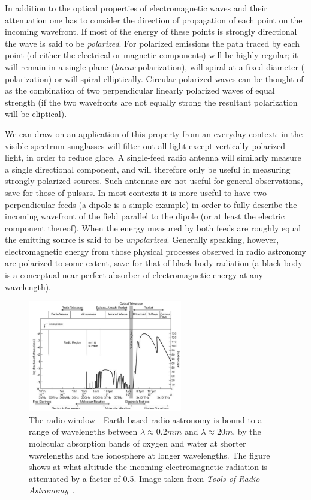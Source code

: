 \documentclass[a4paper,10pt]{report}
\begin{document}
In addition to the optical properties of electromagnetic waves and their attenuation one has to consider the direction of propagation of each point on the incoming wavefront. If most of the energy of these points is strongly 
directional the wave is said to be \textit{polarized}. For polarized emissions the path traced by each point (of either the electrical or magnetic components) will be highly regular; it will 
remain in a single plane (\textit{linear} polarization), will spiral at a fixed diameter ( polarization) or will spiral elliptically. Circular polarized waves can be thought 
of as the combination of two perpendicular linearly polarized waves of equal strength (if the two wavefronts are not equally strong the resultant polarization will be eliptical). 

We can draw on an application of this property from an everyday context: in the visible spectrum sunglasses will filter out all light except vertically polarized light, in order to reduce glare. A single-feed radio 
antenna will similarly measure a single directional component, and will therefore only be useful in measuring strongly polarized sources. Such antennae are not useful for general observations, save for 
those of pulsars. In most contexts it is more useful to have two perpendicular feeds (a dipole is a simple example) in order to fully describe the incoming wavefront of the field parallel to the dipole (or at least 
the electric component thereof). When the energy measured by both feeds are roughly equal the emitting source is said to be \textit{unpolarized}. Generally speaking, however, electromagnetic energy from those 
physical processes observed in radio astronomy are polarized to some extent, save for that of black-body radiation (a black-body is a conceptual near-perfect absorber of electromagnetic energy at any wavelength).
\begin{figure}[ht]
 \begin{mdframed}
 \centering
 \includegraphics[width=0.6\textwidth]{images/radio_window.png}
 \caption[The radio window]{The radio window - Earth-based radio astronomy is bound to a range of wavelengths between $\lambda\approx 0.2mm$ and $\lambda\approx 20m$, by the molecular absorption bands of oxygen and water at
 shorter wavelengths and the ionosphere at longer wavelengths. The figure shows at what altitude the incoming electromagnetic radiation is attenuated by a factor of 0.5. Image taken from \textit{Tools of Radio Astronomy}~\cite{wilson2009tools}.}
 \label{fig_radio_window}
 \end{mdframed}
\end{figure}
\end{document}

